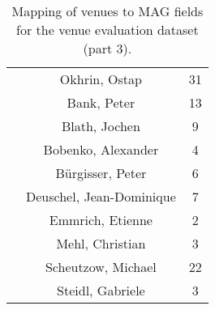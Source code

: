 \begin{table}
\begin{tabular}{|c|c|c|}
& Okhrin, Ostap & 31 \\ \cline{2-3}
& Bank, Peter & 13 \\ \cline{2-3}
& Blath, Jochen & 9 \\ \cline{2-3}
& Bobenko, Alexander & 4 \\ \cline{2-3}
& Bürgisser, Peter & 6 \\ \cline{2-3}
& Deuschel, Jean-Dominique & 7 \\ \cline{2-3}
& Emmrich, Etienne & 2 \\ \cline{2-3}
& Mehl, Christian & 3 \\ \cline{2-3}
& Scheutzow, Michael & 22 \\ \cline{2-3}
& Steidl, Gabriele & 3 \\ \cline{2-3}
\hline
\end{tabular}
\caption{Mapping of venues to MAG fields for the venue evaluation dataset (part 3).}
\label{tab:venue_field_map_3}
\end{table}

